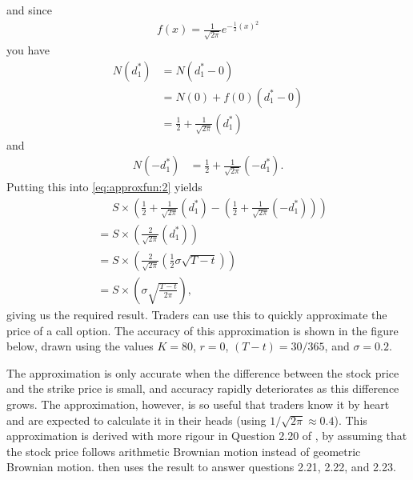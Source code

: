 \documentclass[11pt]{article}
\begin{document}
and since
\begin{align*}
f(x) =
     \frac{1}{ \sqrt{ 2\pi } }
     e^{ - \frac{1}{2} (x)^2 }
\end{align*}
you have
\begin{align*}
N(d_1^*)&= N(d_1^* - 0) \\
            &= N(0) + f(0)(d_1^* - 0) \\
            &= \frac{1}{2} +  \frac{1}{ \sqrt{ 2\pi } }
            (d_1^* )
\end{align*}
and
\begin{align*}
N(-d_1^*) &= \frac{1}{2} +  \frac{1}{ \sqrt{ 2\pi } } (- d_1^* )
\text{.}
\end{align*}
Putting this into \eqref{eq:approxfun:2} yields
\begin{align*}
&\phantom{{}={}}
S \times \left(
\frac{1}{2} +  \frac{1}{ \sqrt{ 2\pi } } ( d_1^* ) -
\left(
\frac{1}{2} +  \frac{1}{ \sqrt{ 2\pi } } (- d_1^* )
\right)
\right)
\\
&=
S \times \left(
    \frac{2}{ \sqrt{ 2\pi } } ( d_1^* )
\right)
\\
&=
S \times \left(
    \frac{ 2 }{ \sqrt{ 2 \pi } }
    \left(
    \frac{1}{2} \sigma \sqrt{T - t}
    \right)
\right)
\\
&=
S \times \left(
     \sigma
    \sqrt{\frac{ T - t }{  2 \pi  }}
\right)
\text{,}
\end{align*}
giving us the required result.
Traders can use this to quickly approximate the price of a call option.
The accuracy of this approximation is shown in the figure below, drawn using
the values
$K = 80$,
$r = 0$,
$(T-t) = 30/365$, and
$\sigma=0.2$.
%
\begin{figure}[!htb]
\begin{center}

\end{center}
\end{figure}
%
%
The approximation is only accurate when the difference between the stock price and the strike price is small, and accuracy rapidly deteriorates as this difference grows.
The approximation, however, is so useful that traders know it by heart and are expected to calculate it in their heads (using $1/\sqrt{2\pi} \approx 0.4$).
This approximation is derived with more rigour in Question 2.20 of \citet{HeardOnTheStreet}, by assuming that the stock price follows arithmetic Brownian motion instead of geometric Brownian motion.
\citet{HeardOnTheStreet} then uses the result to answer questions 2.21, 2.22, and 2.23.
\end{document}
